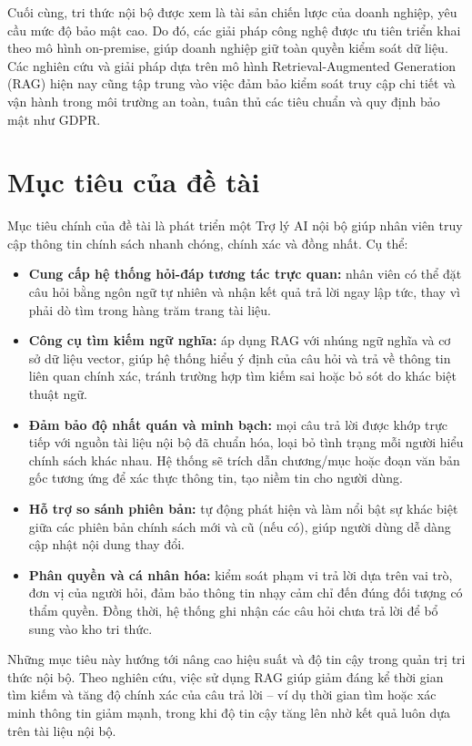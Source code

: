 \documentclass[12pt,a4paper]{report}
\begin{document}
Cuối cùng, tri thức nội bộ được xem là tài sản chiến lược của doanh nghiệp, yêu cầu mức độ bảo mật cao. Do đó, các giải pháp công nghệ được ưu tiên triển khai theo mô hình on-premise, giúp doanh nghiệp giữ toàn quyền kiểm soát dữ liệu. Các nghiên cứu và giải pháp dựa trên mô hình Retrieval-Augmented Generation (RAG) hiện nay cũng tập trung vào việc đảm bảo kiểm soát truy cập chi tiết và vận hành trong môi trường an toàn, tuân thủ các tiêu chuẩn và quy định bảo mật như GDPR.

\section{Mục tiêu của đề tài}
Mục tiêu chính của đề tài là phát triển một Trợ lý AI nội bộ giúp nhân viên truy cập thông tin chính sách nhanh chóng, chính xác và đồng nhất. Cụ thể:

\begin{itemize}
    \item \textbf{Cung cấp hệ thống hỏi-đáp tương tác trực quan:} nhân viên có thể đặt câu hỏi bằng ngôn ngữ tự nhiên và nhận kết quả trả lời ngay lập tức, thay vì phải dò tìm trong hàng trăm trang tài liệu.
    \item \textbf{Công cụ tìm kiếm ngữ nghĩa:} áp dụng RAG với nhúng ngữ nghĩa và cơ sở dữ liệu vector, giúp hệ thống hiểu ý định của câu hỏi và trả về thông tin liên quan chính xác, tránh trường hợp tìm kiếm sai hoặc bỏ sót do khác biệt thuật ngữ.
    \item \textbf{Đảm bảo độ nhất quán và minh bạch:} mọi câu trả lời được khớp trực tiếp với nguồn tài liệu nội bộ đã chuẩn hóa, loại bỏ tình trạng mỗi người hiểu chính sách khác nhau. Hệ thống sẽ trích dẫn chương/mục hoặc đoạn văn bản gốc tương ứng để xác thực thông tin, tạo niềm tin cho người dùng.
    \item \textbf{Hỗ trợ so sánh phiên bản:} tự động phát hiện và làm nổi bật sự khác biệt giữa các phiên bản chính sách mới và cũ (nếu có), giúp người dùng dễ dàng cập nhật nội dung thay đổi.
    \item \textbf{Phân quyền và cá nhân hóa:} kiểm soát phạm vi trả lời dựa trên vai trò, đơn vị của người hỏi, đảm bảo thông tin nhạy cảm chỉ đến đúng đối tượng có thẩm quyền. Đồng thời, hệ thống ghi nhận các câu hỏi chưa trả lời để bổ sung vào kho tri thức.
\end{itemize}

Những mục tiêu này hướng tới nâng cao hiệu suất và độ tin cậy trong quản trị tri thức nội bộ. Theo nghiên cứu, việc sử dụng RAG giúp giảm đáng kể thời gian tìm kiếm và tăng độ chính xác của câu trả lời – ví dụ thời gian tìm hoặc xác minh thông tin giảm mạnh, trong khi độ tin cậy tăng lên nhờ kết quả luôn dựa trên tài liệu nội bộ.
\end{document}

